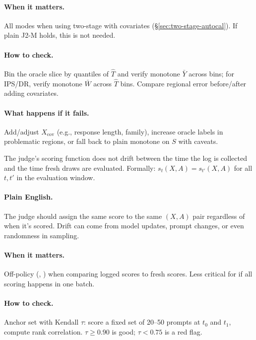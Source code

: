 \paragraph{When it matters.} All modes when using two-stage \autocal{} with covariates (\S\ref{sec:two-stage-autocal}). If plain J2-M holds, this is not needed.

\paragraph{How to check.} Bin the oracle slice by quantiles of $\widehat T$ and verify monotone $\bar Y$ across bins; for IPS/DR, verify monotone $\bar W$ across $\widehat T$ bins. Compare regional error before/after adding covariates.

\paragraph{What happens if it fails.} Add/adjust $X_{\mathrm{cov}}$ (e.g., response length, family), increase oracle labels in problematic regions, or fall back to plain monotone on $S$ with caveats.

\begin{assumption}
\label{assum:stability}
The judge's scoring function does not drift between the time the log is collected and the time fresh draws are evaluated. Formally: $s_t(X, A) = s_{t'}(X, A)$ for all $t, t'$ in the evaluation window.
\end{assumption}

\paragraph{Plain English.} The judge should assign the same score to the same $(X, A)$ pair regardless of when it's scored. Drift can come from model updates, prompt changes, or even randomness in sampling.

\paragraph{When it matters.} Off-policy (\ips, \dr) when comparing logged scores to fresh scores. Less critical for \dm{} if all scoring happens in one batch.

\paragraph{How to check.} Anchor set with Kendall $\tau$: score a fixed set of 20--50 prompts at $t_0$ and $t_1$, compute rank correlation. $\tau \ge 0.90$ is good; $\tau < 0.75$ is a red flag.

